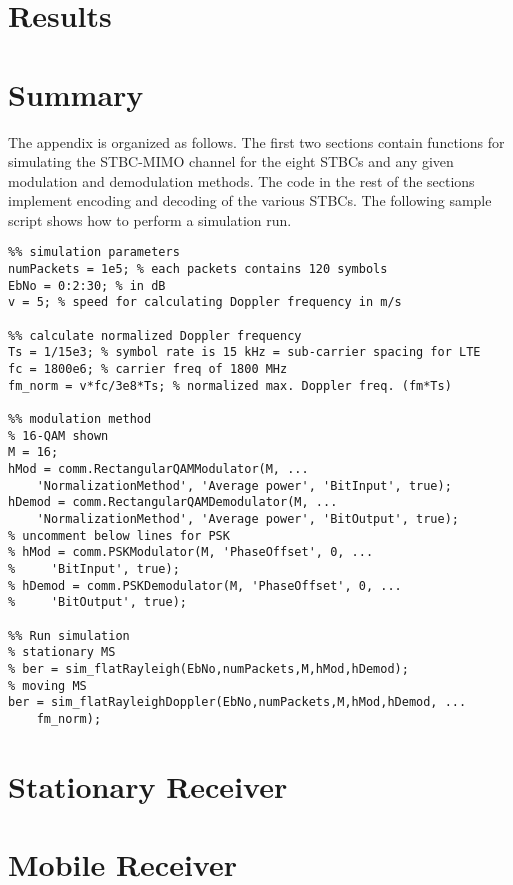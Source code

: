 \documentclass[12pt,onecolumn]{IEEEtran}
\begin{document}
\section{Results}


\section{Summary}




\appendix

The appendix is organized as follows. The first two sections contain functions for simulating the STBC-MIMO channel for the eight STBCs and any given modulation and demodulation methods. The code in the rest of the sections implement encoding and decoding of the various STBCs. The following sample script shows how to perform a simulation run.

\begin{lstlisting}
%% simulation parameters
numPackets = 1e5; % each packets contains 120 symbols
EbNo = 0:2:30; % in dB
v = 5; % speed for calculating Doppler frequency in m/s

%% calculate normalized Doppler frequency
Ts = 1/15e3; % symbol rate is 15 kHz = sub-carrier spacing for LTE
fc = 1800e6; % carrier freq of 1800 MHz
fm_norm = v*fc/3e8*Ts; % normalized max. Doppler freq. (fm*Ts)

%% modulation method
% 16-QAM shown
M = 16;
hMod = comm.RectangularQAMModulator(M, ...
    'NormalizationMethod', 'Average power', 'BitInput', true);
hDemod = comm.RectangularQAMDemodulator(M, ...
    'NormalizationMethod', 'Average power', 'BitOutput', true);
% uncomment below lines for PSK
% hMod = comm.PSKModulator(M, 'PhaseOffset', 0, ...
%     'BitInput', true);
% hDemod = comm.PSKDemodulator(M, 'PhaseOffset', 0, ...
%     'BitOutput', true);

%% Run simulation
% stationary MS
% ber = sim_flatRayleigh(EbNo,numPackets,M,hMod,hDemod);
% moving MS
ber = sim_flatRayleighDoppler(EbNo,numPackets,M,hMod,hDemod, ...
    fm_norm);
\end{lstlisting}

\appendices

\section{Stationary Receiver}

\section{Mobile Receiver}

\end{document}
